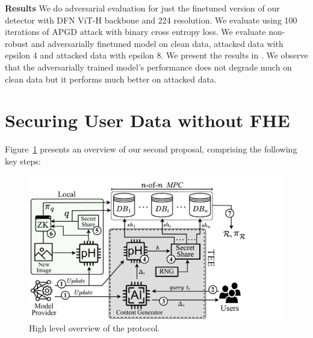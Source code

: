 \textbf{Results} We do adversarial evaluation for just the finetuned version of our detector with DFN ViT-H backbone and 224 resolution. We evaluate using 100 iterations of APGD attack with binary cross entropy loss. We evaluate non-robust and adversarially finetuned model on clean data, attacked data with epsilon 4 and attacked data with epsilon 8. We present the results in . We observe that the adversarially trained model's performance does not degrade much on clean data but it performs much better on attacked data.

\section{Securing User Data without FHE}\label{sec:apx-mpc}

Figure~\ref{fig:protocol} presents an overview of our second proposal, comprising the following key steps:

\begin{figure}[t]
  \centering
  \includegraphics[width=\linewidth,trim={0 0 3.2cm 0},clip]{figures/protocol_v3.pdf}
   \caption{High level overview of the protocol.}
   \label{fig:protocol}
\end{figure}

